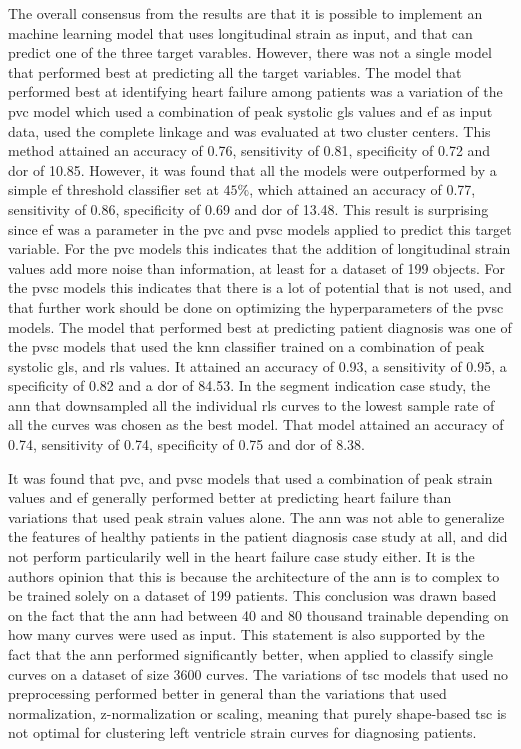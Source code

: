 The overall consensus from the results are that it is possible to implement an machine learning model that uses longitudinal strain as input, and that can predict one of the three target varables. However, there was not a single model that performed best at predicting all the target variables. The model that performed best at identifying heart failure among patients was a variation of the \acrshort{pvc} model which used a combination of peak systolic \acrshort{gls} values and \acrshort{ef} as input data, used the complete linkage and was evaluated at two cluster centers. This method attained an accuracy of 0.76, sensitivity of 0.81, specificity of 0.72 and \acrshort{dor} of 10.85. However, it was found that all the models were outperformed by a simple \acrshort{ef} threshold classifier set at $45\%$, which attained an accuracy of 0.77, sensitivity of 0.86, specificity of 0.69 and \acrshort{dor} of 13.48. This result is surprising since \acrshort{ef} was a parameter in the \acrshort{pvc} and \acrshort{pvsc} models applied to predict this target variable. For the \acrshort{pvc} models this indicates that the addition of longitudinal strain values add more noise than information, at least for a dataset of 199 objects. For the \acrshort{pvsc} models this indicates that there is a lot of potential that is not used, and that further work should be done on optimizing the hyperparameters of the \acrshort{pvsc} models. The model that performed best at predicting patient diagnosis was one of the \acrshort{pvsc} models that used the \acrshort{knn} classifier trained on a combination of peak systolic \acrshort{gls}, and \acrshort{rls} values. It attained an accuracy of 0.93, a sensitivity of 0.95, a specificity of 0.82 and a \acrshort{dor} of 84.53. In the segment indication case study, the \acrshort{ann} that downsampled all the individual \acrshort{rls} curves to the lowest sample rate of all the curves was chosen as the best model. That model attained an accuracy of 0.74, sensitivity of 0.74, specificity of 0.75 and \acrshort{dor} of 8.38. \bigskip

It was found that \acrshort{pvc}, and \acrshort{pvsc} models that used a combination of peak strain values and \acrshort{ef} generally performed better at predicting heart failure than variations that used peak strain values alone. The \acrshort{ann} was not able to generalize the features of healthy patients in the patient diagnosis case study at all, and did not perform particularily well in the heart failure case study either. It is the authors opinion that this is because the architecture of the \acrshort{ann} is to complex to be trained solely on a dataset of 199 patients. This conclusion was drawn based on the fact that the \acrshort{ann} had between 40 and 80 thousand trainable depending on how many curves were used as input. This statement is also supported by the fact that the \acrshort{ann} performed significantly better, when applied to classify single curves on a dataset of size 3600 curves. The variations of \acrshort{tsc} models that used no preprocessing performed better in general than the variations that used normalization, z-normalization or scaling, meaning that purely shape-based \acrshort{tsc} is not optimal for clustering left ventricle strain curves for diagnosing patients.

